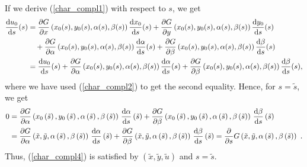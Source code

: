 If we derive (\ref{char_compl1}) with respect to $s$, we get
\begin{align*}
\dydx{u_0}{s}(s)
&= \pdydx{G}{x}\left(x_0(s), y_0(s), \alpha(s), \beta(s)\right)
\dydx{x_0}{s}(s) + \pdydx{G}{y}\left(x_0(s), y_0(s), \alpha(s), \beta(s)\right)
\dydx{y_0}{s}(s) \\
&\quad + \pdydx{G}{\alpha}\left(x_0(s), y_0(s), \alpha(s), \beta(s)\right)
\dydx{\alpha}{s}(s)
+ \pdydx{G}{\beta}\left(x_0(s), y_0(s), \alpha(s), \beta(s)\right)
\dydx{\beta}{s}(s) \\
&= \dydx{u_0}{s}(s)
+ \pdydx{G}{\alpha}\left(x_0(s), y_0(s), \alpha(s), \beta(s)\right)
\dydx{\alpha}{s}(s)
+ \pdydx{G}{\beta}\left(x_0(s), y_0(s), \alpha(s), \beta(s)\right)
\dydx{\beta}{s}(s) ,
\end{align*}
where we have used (\ref{char_compl2}) to get the second equality.  Hence,
for $s=\tilde{s}$, we get
\begin{align*}
0 &= \pdydx{G}{\alpha}\left(x_0\left(\tilde{s}\right),
y_0\left(\tilde{s}\right), \alpha\left(\tilde{s}\right),
\beta\left(\tilde{s}\right)\right)\,\dydx{\alpha}{s}\left(\tilde{s}\right) +
\pdydx{G}{\beta}\left(x_0\left(\tilde{s}\right), y_0\left(\tilde{s}\right),
\alpha\left(\tilde{s}\right), \beta\left(\tilde{s}\right)\right)\,
\dydx{\beta}{s}\left(\tilde{s}\right) \\
&= \pdydx{G}{\alpha}\left(\tilde{x}, \tilde{y},\alpha\left(\tilde{s}\right),
\beta\left(\tilde{s}\right)\right)\, \dydx{\alpha}{s}\left(\tilde{s}\right)
+ \pdydx{G}{\beta}\left(\tilde{x}, \tilde{y},\alpha\left(\tilde{s}\right),
\beta\left(\tilde{s}\right)\right)\, \dydx{\beta}{s}\left(\tilde{s}\right)
= \pdfdx{G}{s}\left(\tilde{x}, \tilde{y}, \alpha\left(\tilde{s}\right),
\beta\left(\tilde{s}\right)\right) \ .
\end{align*}
Thus, (\ref{char_compl4}) is satisfied by
$\displaystyle \left(\tilde{x},\tilde{y},\tilde{u}\right)$
and $s=\tilde{s}$.

